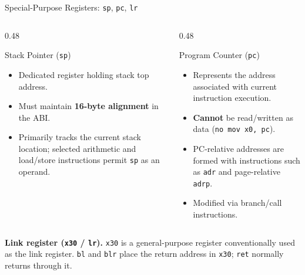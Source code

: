 \documentclass[aspectratio=169,11pt,t,xcolor=table]{beamer}
\newcommand{\key}[1]{\textbf{#1}}
\newcommand{\bits}[1]{\texttt{#1}}
\newcommand{\code}[1]{\texttt{#1}}
\begin{document}
\begin{frame}{Special-Purpose Registers: \texttt{sp}, \texttt{pc}, \texttt{lr}}
\vspace{0.05cm}
\begin{columns}[T]
\begin{column}{0.48\textwidth}
\begin{block}{Stack Pointer (\texttt{sp})}
\small
\begin{itemize}\setlength{\itemsep}{3pt}
  \item Dedicated register holding stack top address.
  \item Must maintain \key{16-byte alignment} in the ABI.
  \item Primarily tracks the current stack location; selected arithmetic and load/store instructions permit \bits{sp} as an operand.
\end{itemize}
\end{block}
\end{column}

\begin{column}{0.48\textwidth}
\begin{block}{Program Counter (\texttt{pc})}
\small
\begin{itemize}\setlength{\itemsep}{3pt}
  \item Represents the address associated with current instruction execution.
  \item \key{Cannot} be read/written as data (\code{no mov x0, pc}).
  \item PC-relative addresses are formed with instructions such as \code{adr} and page-relative \code{adrp}.
  \item Modified via branch/call instructions.
\end{itemize}
\end{block}
\end{column}
\end{columns}

\vfill
\footnotesize
\textbf{Link register (\texttt{x30} / \texttt{lr}).} \bits{x30} is a general-purpose register conventionally used as the link register. \code{bl} and \code{blr} place the return address in \bits{x30}; \code{ret} normally returns through it.
\end{frame}









\end{document}
